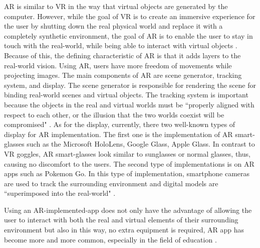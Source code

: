AR is similar to VR in the way that virtual objects are generated by the computer. However, while the goal of VR is to create an immersive experience for the user by shutting down the real physical world and replace it with a completely synthetic environment, the goal of AR is to enable the user to stay in touch with the real-world, while being able to interact with virtual objects \parencite{chamba-eras_augmented_2017}. Because of this, the defining characteristic of AR is that it adds layers to the real-world vision. Using AR, users have more freedom of movements while projecting images. The main components of AR are scene generator, tracking system, and display. The scene generator is responsible for rendering the scene for binding real-world scenes and virtual objects. The tracking system is important because the objects in the real and virtual worlds must be “properly aligned with respect to each other, or the illusion that the two worlds coexist will be compromised" \parencite{silva_introduction_2003}. As for the display, currently, there two well-known types of display for AR implementation. The first one is the implementation of AR smart-glasses such as the Microsoft HoloLens, Google Glass, Apple Glass. In contrast to VR goggles, AR smart-glasses look similar to sunglasses or normal glasses, thus, causing no discomfort to the users. The second type of implementations is on AR apps such as Pokemon Go. In this type of implementation, smartphone cameras are used to track the surrounding environment and digital models are “superimposed into the real-world" \parencite{moro_effectiveness_2017}.

Using an AR-implemented-app does not only have the advantage of allowing the user to interact with both the real and virtual elements of their surrounding environment but also in this way, no extra equipment is required, AR app has become more and more common, especially in the field of education \parencite{moro_effectiveness_2017}.


